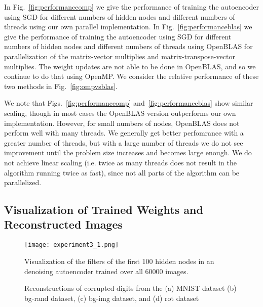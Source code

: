 In  Fig.~\ref{fig:performanceomp} we give the performance of training the autoencoder using SGD for different numbers of hidden nodes and different numbers of threads using our own parallel implementation.
In  Fig.~\ref{fig:performanceblas} we give the performance of training the autoencoder using SGD for different numbers of hidden nodes and different numbers of threads using OpenBLAS for parallelization of the matrix-vector multiplies and matrix-transpose-vector multiplies. The weight updates are not able to be done in OpenBLAS, and so we continue to do that using OpenMP. We consider the relative performance of these two methods in Fig.~\ref{fig:ompvsblas}.

We note that Figs.~\ref{fig:performanceomp} and~\ref{fig:performanceblas} show similar scaling, though in most cases the OpenBLAS version outperforms our own implementation. However, for small numbers of nodes, OpenBLAS does not perform well with many threads.
We generally get better perfomrance with a greater number of threads, but with a large number of threads we do not see improvement until the problem size increases and becomes large enough. We do not achieve linear scaling (i.e. twice as many threads does not result in the algorithm running twice as fast), since not all parts of the algorithm can be parallelized. 

\subsection{Visualization of Trained Weights and Reconstructed Images}

\begin{figure}[h] \centering
  \texttt{[image: experiment3\_1.png]}
  \caption{Visualization of the filters of the first 100 hidden nodes in an
  denoising autoencoder trained over all 60000 images.}
  \label{fig:experiment3_1}
\end{figure}

\begin{figure*}
  \centering
  \hspace{5mm}
  \caption{Reconstructions of corrupted digits from the (a) MNIST dataset (b) bg-rand dataset, (c) bg-img dataset, and (d) rot dataset}
  \label{fig:reconstruct}
\end{figure*}

